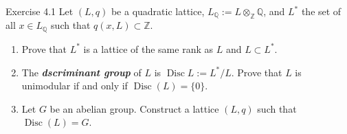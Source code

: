 \begin{idea4}{Exercise 4.1}\leavevmode
	Let $(L,q)$ be a quadratic lattice, $L_{\mathbb{Q}}:=L\otimes_{\mathbb{Z}}\mathbb{Q}$, and $L^*$ the set of all $x\in L_{\mathbb{Q}}$ such that $q(x,L)\subset \mathbb{Z}$.
	\begin{enumerate}[label=\alph*.]
		\item Prove that $L^*$ is a lattice of the same rank as $L$ and $L\subset L^*$.
		\item The \textit{\textbf{dscriminant group}} of $L$ is $\operatorname{Disc}L:=L^*/L$. Prove that $L$ is unimodular if and only if $\operatorname{Disc}(L)=\{0\}$.
		\item Let $G$ be an abelian group. Construct a lattice $(L,q)$ such that $\operatorname{Disc}(L)=G$.
	\end{enumerate}
\end{idea4}

